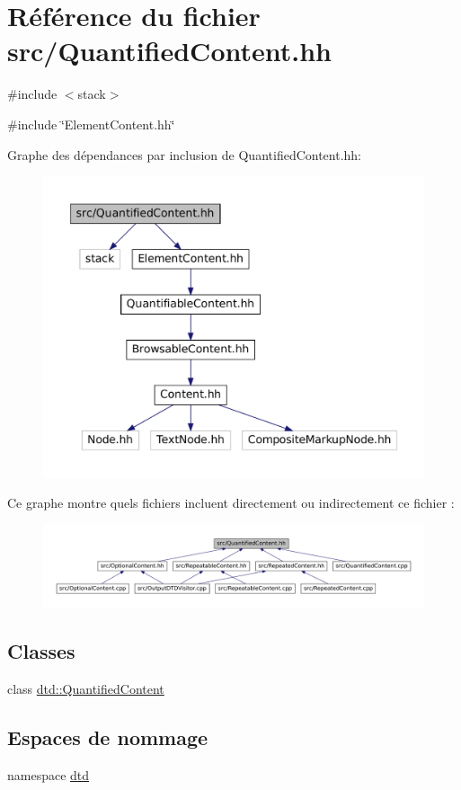\hypertarget{_quantified_content_8hh}{
\section{Référence du fichier src/QuantifiedContent.hh}
\label{_quantified_content_8hh}
}
{\ttfamily \#include $<$stack$>$}\par
{\ttfamily \#include \char`\"{}ElementContent.hh\char`\"{}}\par
Graphe des dépendances par inclusion de QuantifiedContent.hh:\nopagebreak
\begin{figure}[H]
\begin{center}
\leavevmode
\includegraphics[width=400pt]{_quantified_content_8hh__incl}
\end{center}
\end{figure}
Ce graphe montre quels fichiers incluent directement ou indirectement ce fichier :\nopagebreak
\begin{figure}[H]
\begin{center}
\leavevmode
\includegraphics[width=400pt]{_quantified_content_8hh__dep__incl}
\end{center}
\end{figure}
\subsection*{Classes}
\begin{DoxyCompactItemize}
\item 
class \hyperlink{classdtd_1_1_quantified_content}{dtd::QuantifiedContent}
\end{DoxyCompactItemize}
\subsection*{Espaces de nommage}
\begin{DoxyCompactItemize}
\item 
namespace \hyperlink{namespacedtd}{dtd}
\end{DoxyCompactItemize}
